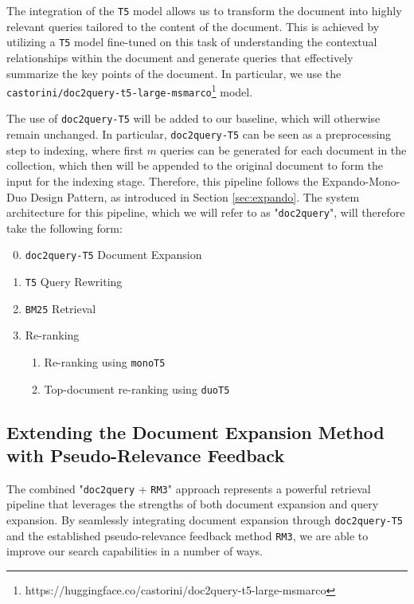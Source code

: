 \documentclass[sigconf]{acmart}
\begin{document}
The integration of the \texttt{T5} model allows us to transform the document into highly relevant queries tailored to the content of the document. This is achieved by utilizing a \texttt{T5} model fine-tuned on this task of understanding the contextual relationships within the document and generate queries that effectively summarize the key points of the document. In particular, we use the \texttt{castorini\-/doc2query\--t5\--large\--msmarco}\footnote{https://huggingface.co/castorini/doc2query-t5-large-msmarco} model.

The use of \texttt{doc2query-T5} will be added to our baseline, which will otherwise remain unchanged. In particular, \texttt{doc2query-T5} can be seen as a preprocessing step to indexing, where first $m$ queries can be generated for each document in the collection, which then will be appended to the original document to form the input for the indexing stage. Therefore, this pipeline follows the Expando-Mono-Duo Design Pattern, as introduced in Section \ref{sec:expando}. The system architecture for this pipeline, which we will refer to as "\texttt{doc2query}", will therefore take the following form:
\begin{enumerate}
	\setcounter{enumi}{-1}
	\item	\texttt{doc2query-T5} Document Expansion
	\item	\texttt{T5} Query Rewriting
	\item	\texttt{BM25} Retrieval
	\item	Re-ranking
			\begin{enumerate}
				\item	Re-ranking using \texttt{monoT5}
				\item	Top-document re-ranking using \texttt{duoT5}
			\end{enumerate}
\end{enumerate}

\subsection{Extending the Document Expansion Method with Pseudo-Relevance Feedback}\label{sec:doc2query-method+rm3}
The combined "\texttt{doc2query} + \texttt{RM3}" approach represents a powerful retrieval pipeline that leverages the strengths of both document expansion and query expansion. By seamlessly integrating document expansion through \texttt{doc2query-T5} and the established pseudo-relevance feedback method \texttt{RM3}, we are able to improve our search capabilities in a number of ways.
\end{document}

